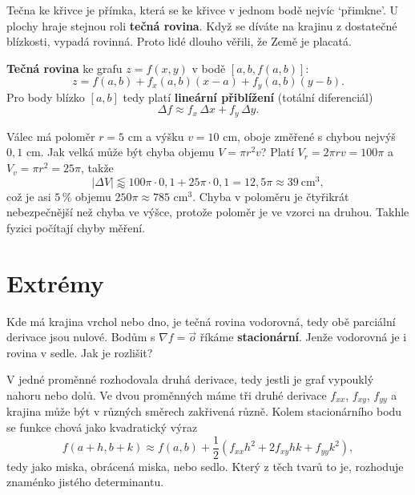 Tečna ke křivce je přímka, která se ke křivce v jednom bodě nejvíc `přimkne'. U plochy hraje stejnou roli \textbf{tečná rovina}. Když se díváte na krajinu z dostatečné blízkosti, vypadá rovinná. Proto lidé dlouho věřili, že Země je placatá.

\begin{definitionbox}
  \textbf{Tečná rovina} ke grafu $z = f(x, y)$ v bodě $[a, b, f(a, b)]$:
  \begin{equation*}
    z = f(a, b) + f_x(a, b)(x - a) + f_y(a, b)(y - b).
  \end{equation*}
  Pro body blízko $[a, b]$ tedy platí \textbf{lineární přiblížení} (totální diferenciál)
  \begin{equation*}
    \Delta f\approx f_x\,\Delta x + f_y\,\Delta y.
  \end{equation*}
\end{definitionbox}

\begin{example}
  Válec má poloměr $r = 5$ cm a výšku $v = 10$ cm, oboje změřené s chybou nejvýš $0{,}1$ cm. Jak velká může být chyba objemu $V = \pi r^2v$? Platí $V_r = 2\pi rv = 100\pi$ a $V_v = \pi r^2 = 25\pi$, takže
  \begin{equation*}
    |\Delta V|\lessapprox 100\pi\cdot 0{,}1 + 25\pi\cdot 0{,}1 = 12{,}5\pi\approx 39\ \text{cm}^3,
  \end{equation*}
  což je asi $5\,\%$ objemu $250\pi\approx 785$ cm$^3$. Chyba v poloměru je čtyřikrát nebezpečnější než chyba ve výšce, protože poloměr je ve vzorci na druhou. Takhle fyzici počítají chyby měření.
\end{example}

\section{Extrémy}

Kde má krajina vrchol nebo dno, je tečná rovina vodorovná, tedy obě parciální derivace jsou nulové. Bodům s $\nabla f = \vec{o}$ říkáme \textbf{stacionární}. Jenže vodorovná je i rovina v sedle. Jak je rozlišit?

V jedné proměnné rozhodovala druhá derivace, tedy jestli je graf vypouklý nahoru nebo dolů. Ve dvou proměnných máme tři druhé derivace $f_{xx}$, $f_{xy}$, $f_{yy}$ a krajina může být v různých směrech zakřivená různě. Kolem stacionárního bodu se funkce chová jako kvadratický výraz
\begin{equation*}
  f(a + h, b + k)\approx f(a, b) + \frac{1}{2}\left(f_{xx}h^2 + 2f_{xy}hk + f_{yy}k^2\right),
\end{equation*}
tedy jako miska, obrácená miska, nebo sedlo. Který z těch tvarů to je, rozhoduje znaménko jistého determinantu.

